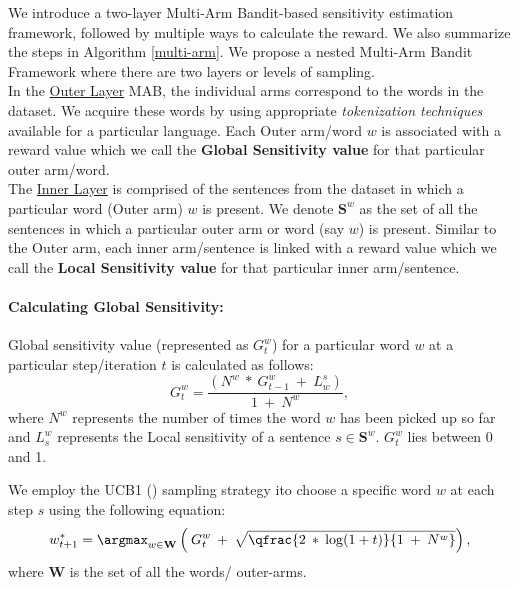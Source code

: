 \label{MAB framework}
We introduce a two-layer Multi-Arm Bandit-based sensitivity estimation framework, followed by multiple ways to calculate the reward. We also summarize the steps in Algorithm \ref{multi-arm}.
We propose a nested Multi-Arm Bandit Framework where there are two layers or levels of sampling. \\\noindent
In the \underline{Outer Layer} MAB, the individual arms correspond to the words in the dataset. We acquire these words by using appropriate \textit{tokenization techniques} available for a particular language. Each Outer arm/word $w$ is associated with a reward value which we call the \textbf{Global Sensitivity value} for that particular outer arm/word.
\\\noindent
The \underline{Inner Layer} is comprised of the sentences from the dataset in which a particular word (Outer arm) $w$ is present. We denote $\textbf{S}^{w}$ as the set of all the sentences in which a particular outer arm or word (say $w$) is present. Similar to the Outer arm, each inner arm/sentence is linked with a reward value which we call the \textbf{Local Sensitivity value} for that particular inner arm/sentence.

\paragraph{Calculating Global Sensitivity:} Global sensitivity value (represented as $G^{w}_{t}$) for a particular word $w$ at a particular step/iteration $t$ is calculated as follows:
\begin{equation*}
    G^{w}_{t} = \frac{(N^w \:* \:G^{w}_{t - 1}\: + \: L^s_{w})}{ 1 \:+ \:N^w},
\end{equation*}
where $N^w$ represents the number of times the word $w$ has been picked up so far and $L^w_s$ represents the Local sensitivity of a sentence $s \in \textbf{S}^{w}$. $G^{w}_{t}$ lies between 0 and 1.
    
We employ the UCB1 (\cite{10.1023/A:1013689704352}) sampling strategy ito choose a specific word $w$ at each step $s$ using the following equation:
\begin{equation}
    w^*_{t + 1} = \argmax_{w \in \textbf{W}} \left(\:G^w_t \:+\: \sqrt{\qfrac{2 \: * \: \log (1 + t)}{1 \:+ \:N^w}}\right),
\end{equation}
where $\textbf{W}$ is the set of all the words/ outer-arms.

